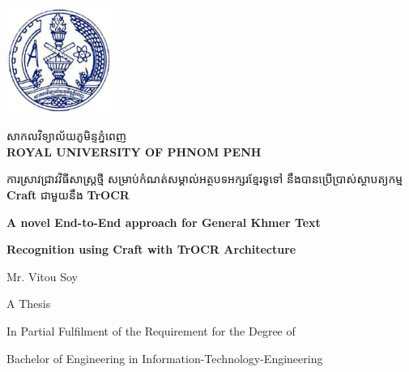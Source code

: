 \begin{titlepage}
    \centering
    \vspace*{1cm}

    \begin{minipage}{0.25\textwidth}
        \includegraphics[width=3.5cm]{figures/RUPP.jpg}
    \end{minipage}
    \hfill
    \begin{minipage}{0.65\textwidth}
        \raggedright
        {\khmerfont\fontsize{16pt}{20pt}\selectfont សាកលវិទ្យាល័យភូមិន្ទភ្នំពេញ\\[0.6em]}
        {\large\bfseries ROYAL UNIVERSITY OF PHNOM PENH}
    \end{minipage}

    \vspace{2cm}

    \begin{minipage}{0.9\textwidth}
        \centering
        {\khmerfont\fontsize{12pt}{20pt}\selectfont ការស្រាវជ្រាវវិធីសាស្ដ្រថ្មី  សម្រាប់កំណត់សម្គាល់អត្ថបទអក្សរខ្មែរទូទៅ នឹងបានប្រើប្រាស់ស្ថាបត្យកម្ម {\englishfont\textbf{Craft}} ជាមួយនឹង {\englishfont\textbf{TrOCR}}\\[0.4em]}
        {\englishfont\fontsize{15pt}{20pt}\selectfont\bfseries A novel End-to-End approach for General Khmer Text \par}
        {\englishfont\fontsize{15pt}{20pt}\selectfont\bfseries Recognition using Craft with TrOCR Architecture \par}
    \end{minipage}

    \vspace{3.0cm}

    {\englishfont\fontsize{16pt}{20pt}\selectfont Mr. Vitou Soy\par}

    \vspace{3.0cm}

    {\englishfont\fontsize{16pt}{20pt}\selectfont A Thesis\par}
    \vspace{0.5cm}
    {\large In Partial Fulfilment of the Requirement for the Degree of\par}
    {\large Bachelor of Engineering in Information-Technology-Engineering\par}
    


\end{titlepage}
